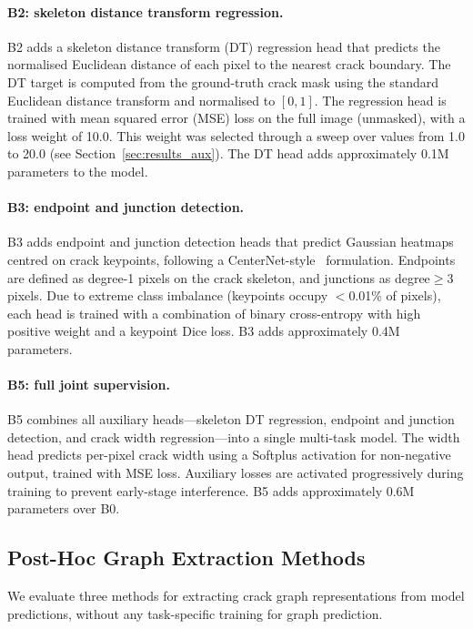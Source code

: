 \documentclass[preprint,12pt]{elsarticle}
\begin{document}
\paragraph{B2: skeleton distance transform regression.}
B2 adds a skeleton distance transform (DT) regression head that predicts the normalised Euclidean distance of each pixel to the nearest crack boundary. The DT target is computed from the ground-truth crack mask using the standard Euclidean distance transform and normalised to $[0, 1]$. The regression head is trained with mean squared error (MSE) loss on the full image (unmasked), with a loss weight of 10.0. This weight was selected through a sweep over values from 1.0 to 20.0 (see Section~\ref{sec:results_aux}). The DT head adds approximately 0.1M parameters to the model.

\paragraph{B3: endpoint and junction detection.}
B3 adds endpoint and junction detection heads that predict Gaussian heatmaps centred on crack keypoints, following a CenterNet-style~\cite{zhou2019centernet} formulation. Endpoints are defined as degree-1 pixels on the crack skeleton, and junctions as degree$\geq$3 pixels. Due to extreme class imbalance (keypoints occupy $<$0.01\% of pixels), each head is trained with a combination of binary cross-entropy with high positive weight and a keypoint Dice loss. B3 adds approximately 0.4M parameters.

\paragraph{B5: full joint supervision.}
B5 combines all auxiliary heads---skeleton DT regression, endpoint and junction detection, and crack width regression---into a single multi-task model. The width head predicts per-pixel crack width using a Softplus activation for non-negative output, trained with MSE loss. Auxiliary losses are activated progressively during training to prevent early-stage interference. B5 adds approximately 0.6M parameters over B0.

\subsection{Post-Hoc Graph Extraction Methods}
\label{sec:graph_extraction}

We evaluate three methods for extracting crack graph representations from model predictions, without any task-specific training for graph prediction.
\end{document}

